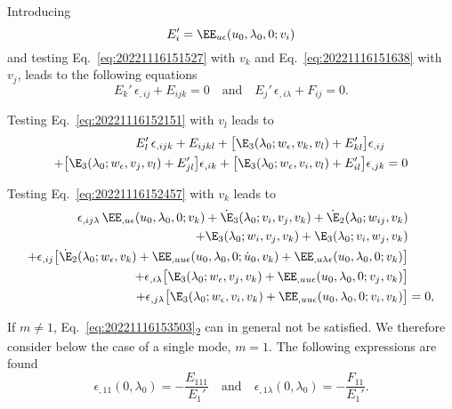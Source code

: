 Introducing
\begin{equation}
  E'_i = \EE_{u\epsilon}(u_0, \lambda_0, 0; v_i)
\end{equation}
and testing Eq.~\eqref{eq:20221116151527} with \(v_k\) and Eq.~\eqref{eq:20221116151638} with \(v_j\), leads to the
following equations
\begin{equation}
  \label{eq:20221116153503}
  E_k' \, \epsilon_{,ij} + E_{ijk} = 0 \quad \text{and} \quad   E_j' \, \epsilon_{,i\lambda} + F_{ij} = 0.
\end{equation}

Testing Eq.~\eqref{eq:20221116152151} with \(v_l\) leads to
\begin{equation}
  \begin{aligned}[b]
     E_l' \, \epsilon_{,ijk} + E_{ijkl} + \bigl[ \E_3(\lambda_0; w_\epsilon, v_k, v_l) + E_{kl}' \bigr] \epsilon_{,ij} &\\
    + \bigl[ \E_3(\lambda_0;  w_\epsilon, v_j, v_l) + E_{jl}' \bigr] \epsilon_{,ik} + \bigl[ \E_3(\lambda_0; w_\epsilon, v_i, v_l) + E_{il}' \bigr] \epsilon_{,jk} &= 0\\
  \end{aligned}
\end{equation}

Testing Eq.~\eqref{eq:20221116152457} with \(v_k\) leads to
\begin{equation}
  \begin{aligned}[b]
    \epsilon_{,ij\lambda} \, \EE_{,u\epsilon}(u_0, \lambda_0, 0; v_k) + \dot{\E}_3(\lambda_0; v_i, v_j, v_k) + \dot{\E}_2(\lambda_0; w_{ij}, v_k) &\\
    + \E_3(\lambda_0; w_i, v_j, v_k) + \E_3(\lambda_0; v_i, w_j, v_k) &\\
    + \epsilon_{,ij} \bigl[ \dot{\E}_2(\lambda_0; w_\epsilon, v_k) + \EE_{,uu\epsilon}(u_0, \lambda_0, 0; \dot{u}_0, v_k) + \EE_{,u\lambda\epsilon}(u_0, \lambda_0, 0; v_k)\bigr] &\\
    + \epsilon_{,i\lambda} \bigl[ \E_3(\lambda_0; w_\epsilon, v_j, v_k) + \EE_{,uu\epsilon}(u_0, \lambda_0, 0; v_j, v_k) \bigr] &\\
    + \epsilon_{,j\lambda} \bigl[ \E_3(\lambda_0; w_\epsilon, v_i, v_k) + \EE_{,uu\epsilon}(u_0, \lambda_0, 0; v_i, v_k) \bigr] &= 0,
  \end{aligned}
\end{equation}


If \(m \neq 1\), Eq.~\eqref{eq:20221116153503}\textsubscript{2} can in general not be satisfied. We therefore consider
below the case of a single mode, \(m=1\). The following expressions are found
\begin{equation}
  \label{eq:20221116153503}
   \epsilon_{,11}(0, \lambda_0) = -\frac{E_{111}}{E_1'} \quad \text{and} \quad \epsilon_{,1\lambda}(0, \lambda_0) = -\frac{F_{11}}{E_1'}.
\end{equation}

